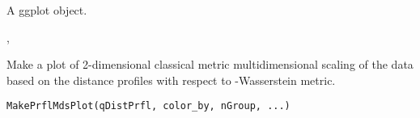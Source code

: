 \documentclass[a4paper]{book}
\begin{document}
%
\begin{Value}
A ggplot object.
\end{Value}
%
\begin{SeeAlso}\relax
{}, 
\end{SeeAlso}
%
\begin{Examples}
\end{Examples}
%
\begin{Description}\relax
Make a plot of 2-dimensional classical metric multidimensional scaling of the 
data based on the distance profiles with respect to -Wasserstein metric.
\end{Description}
%
\begin{Usage}
\begin{verbatim}
MakePrflMdsPlot(qDistPrfl, color_by, nGroup, ...)
\end{verbatim}
\end{Usage}
%
\end{document}
